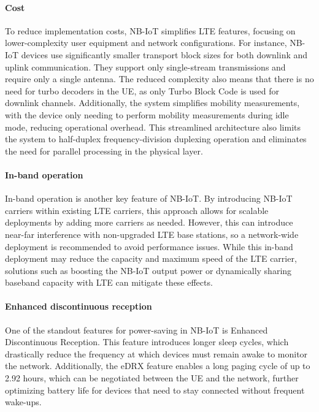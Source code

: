 \paragraph*{Cost}
To reduce implementation costs, NB-IoT simplifies LTE features, focusing on lower-complexity user equipment and network configurations. 
For instance, NB-IoT devices use significantly smaller transport block sizes for both downlink and uplink communication. 
They support only single-stream transmissions and require only a single antenna. 
The reduced complexity also means that there is no need for turbo decoders in the UE, as only Turbo Block Code is used for downlink channels. 
Additionally, the system simplifies mobility measurements, with the device only needing to perform mobility measurements during idle mode, reducing operational overhead. 
This streamlined architecture also limits the system to half-duplex frequency-division duplexing operation and eliminates the need for parallel processing in the physical layer.

\paragraph*{In-band operation}
In-band operation is another key feature of NB-IoT. 
By introducing NB-IoT carriers within existing LTE carriers, this approach allows for scalable deployments by adding more carriers as needed. 
However, this can introduce near-far interference with non-upgraded LTE base stations, so a network-wide deployment is recommended to avoid performance issues. 
While this in-band deployment may reduce the capacity and maximum speed of the LTE carrier, solutions such as boosting the NB-IoT output power or dynamically sharing baseband capacity with LTE can mitigate these effects.

\paragraph*{Enhanced discontinuous reception}
One of the standout features for power-saving in NB-IoT is Enhanced Discontinuous Reception.
This feature introduces longer sleep cycles, which drastically reduce the frequency at which devices must remain awake to monitor the network. 
Additionally, the eDRX feature enables a long paging cycle of up to 2.92 hours, which can be negotiated between the UE and the network, further optimizing battery life for devices that need to stay connected without frequent wake-ups.

